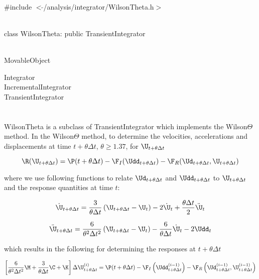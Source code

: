 
   \\
\#include $<\tilde{ }$/analysis/integrator/WilsonTheta.h$>$  


  \\
class WilsonTheta: public TransientIntegrator  


 \\
MovableObject 

\indent\indent Integrator \\
\indent\indent\indent IncrementalIntegrator \\
\indent\indent\indent\indent TransientIntegrator \\
\indent\indent\indent\indent{} \\

 \\ 
\indent WilsonTheta is a subclass of TransientIntegrator which implements
the Wilson$\Theta$ method. In the Wilson$\Theta$ method, to determine the 
velocities, accelerations and displacements at time $t + \theta \Delta
t$, $\theta \ge 1.37$, for $\U_{t+ \theta \Delta t}$ 

$$ \R (\U_{t + \theta \Delta t}) = \P(t + \theta \Delta t) -
\F_I(\Udd_{t+ \theta \Delta t}) 
- \F_R(\Ud_{t + \theta \Delta t},\U_{t + \theta \Delta t}) $$


\noindent where we use following functions to relate $\Ud_{t + \theta
\Delta t}$ and $\Udd_{t + \theta \Delta t}$ to $\U_{t + \theta \Delta
t}$ and the response quantities at time $t$:

$$
\dot \U_{t + \theta \Delta t} = \frac{3}{\theta \Delta t} \left(
\U_{t + \theta \Delta t} - \U_t \right)
 - 2 \dot \U_t + \frac{\theta \Delta t}{2} \ddot \U_t 
$$


$$
\ddot \U_{t + \theta \Delta t} = \frac{6}{\theta^2 \Delta t^2}
\left( \U_{t+\theta \Delta t} - \U_t \right)
 - \frac{6}{\theta \Delta t} \dot \U_t -2 \Udd_t
$$


\noindent which  results in the following for determining the responses at
$t + \theta \Delta t$ 

$$ \left[ \frac{6}{\theta^2 \Delta t^2} \M + \frac{3}{\theta \Delta t}
\C + \K \right] \Delta \U_{t + \theta \Delta t}^{(i)} = \P(t + \theta
\Delta t) - \F_I\left(\Udd_{t+\theta \Delta  t}^{(i-1)}\right) 
- \F_R\left(\Ud_{t + \theta \Delta t}^{(i-1)},\U_{t + \theta \Delta
t}^{(i-1)}\right) $$



